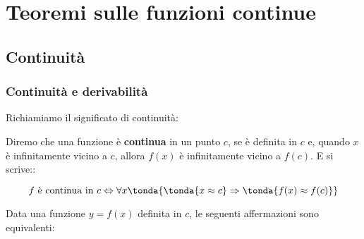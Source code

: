 


\chapter{Teoremi sulle funzioni continue}

\begin{comment}
 
Schema del capitolo
===================
Massimi e minimi
----------------

  Definizione
  '''''''''''
  
    Teorema del punto critico
    
  Proprietà delle f. continue
  '''''''''''''''''''''''''''
  
    I numeri iperinteri
    ...................
    
    Teorema degli zeri
    
    Teorema dei valori estremanti
    
    Teorema di Rolle
    
    Teorema di Lagrange
    
    Corollario

\end{comment}

\section{Continuità}
\label{sec:cont_continuita}

\subsection{Continuità e derivabilità}
\label{subsec:cont_definizione}

Richiamiamo il significato di continuità:

\begin{definizione}
Diremo che una funzione è \textbf{continua} in un punto \(c\), 
se è definita in \(c\) e, 
quando \(x\) è infinitamente vicino a \(c\), 
allora \(f(x)\) è infinitamente vicino a \(f(c)\). E si scrive::

\[f \text{ è continua in } c \Leftrightarrow 
\forall x \tonda{\tonda{x \approx c} \Rightarrow 
\tonda{f(x) \approx f(c)}}\]
\end{definizione}

Data una funzione \(y=f(x)\) definita in \(c\), le seguenti 
affermazioni sono equivalenti:

